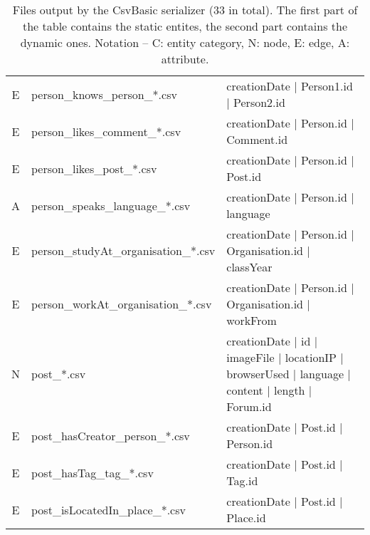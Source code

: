 \begin{table}[htb]
\begin{tabular}{|c|l|l|}
        E                    & person\_knows\_person\_*.csv            & creationDate | Person1.id | Person2.id                                                            \\
        E                    & person\_likes\_comment\_*.csv           & creationDate | Person.id | Comment.id                                                             \\
        E                    & person\_likes\_post\_*.csv              & creationDate | Person.id | Post.id                                                                \\
        A                    & person\_speaks\_language\_*.csv         & creationDate | Person.id | language                                                               \\
        E                    & person\_studyAt\_organisation\_*.csv    & creationDate | Person.id | Organisation.id | classYear                                            \\
        E                    & person\_workAt\_organisation\_*.csv     & creationDate | Person.id | Organisation.id | workFrom                                             \\
        \hline
        N                    & post\_*.csv                             & creationDate | id | imageFile | locationIP | browserUsed | language | content | length | Forum.id \\
        E                    & post\_hasCreator\_person\_*.csv         & creationDate | Post.id | Person.id                                                                \\
        E                    & post\_hasTag\_tag\_*.csv                & creationDate | Post.id | Tag.id                                                                   \\
        E                    & post\_isLocatedIn\_place\_*.csv         & creationDate | Post.id | Place.id                                                                 \\
        \hline
    \end{tabular}
    \caption{Files output by the CsvBasic serializer (33 in total). The first part of the table contains the static entites, the second part contains the dynamic ones. Notation -- C: entity category, N: node, E: edge, A: attribute.}
    \label{table:csv_basic}
\end{table}
